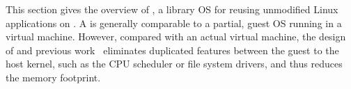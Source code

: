 \label{sec:overview:libos}

This section gives the overview of \graphene{}, a library OS for reusing unmodified Linux applications
on \thehostabi{}.
A \libos{} is generally comparable to a partial, guest OS running in a virtual machine.
However, compared with an actual virtual machine, the \libos{} design of \graphene{} and previous work~\cite{porter11drawbridge,unikernels} eliminates duplicated features between the guest to the host kernel, such as the CPU scheduler or file system drivers, and thus reduces the memory footprint.



